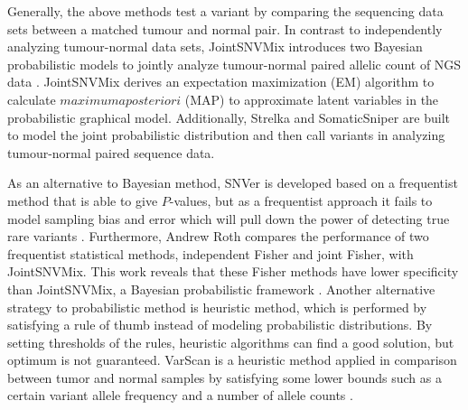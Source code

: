 \documentclass[11pt,reqno]{amsart}
\begin{document}
Generally, the above methods test a variant by comparing the sequencing data sets between a matched tumour and normal pair.
In contrast to independently analyzing tumour-normal data sets, JointSNVMix introduces two Bayesian probabilistic models to jointly analyze tumour-normal paired allelic count of NGS data \citep{roth2012jointsnvmix}.
JointSNVMix derives an expectation maximization (EM) algorithm to calculate $\mathit{maximum a posteriori}$ (MAP) to approximate latent variables in the probabilistic graphical model.
Additionally, Strelka \citep{saunders2012strelka} and SomaticSniper \citep{larson2012somaticsniper} are built to model the joint probabilistic distribution and then call variants in analyzing tumour-normal paired sequence data.

As an alternative to Bayesian method, SNVer is developed based on a frequentist method that is able to give $P$-values, but as a frequentist approach it fails to model sampling bias and error which will pull down the power of detecting true rare variants \citep{wei2011snver}.
Furthermore, Andrew Roth compares the performance of two frequentist statistical methods, independent Fisher and joint Fisher, with JointSNVMix. This work reveals that these Fisher methods have lower specificity than JointSNVMix, a Bayesian probabilistic framework \citep{roth2012jointsnvmix}.
Another alternative strategy to probabilistic method is heuristic method, which is performed by satisfying a rule of thumb instead of modeling probabilistic distributions.
By setting thresholds of the rules, heuristic algorithms can find a good solution, but optimum is not guaranteed.
VarScan is a heuristic method applied in comparison between tumor and normal samples by satisfying some lower bounds such as a certain variant allele frequency and a number of allele counts \citep{koboldt2012varscan}.
\end{document}
